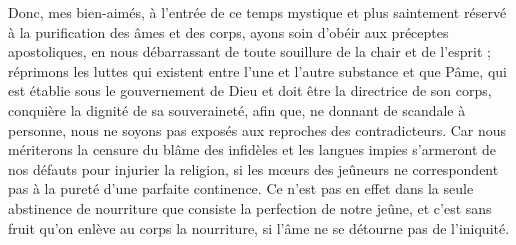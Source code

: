  Donc, mes bien-aimés, à l’entrée de ce temps mystique et plus saintement réservé à la purification des âmes et des corps, ayons soin d’obéir aux préceptes apostoliques, en nous débarrassant de toute souillure de la chair et de l’esprit ; réprimons les luttes qui existent entre l’une et l’autre substance et que Pâme, qui est établie sous le gouvernement de Dieu et doit être la directrice de son corps, conquière la dignité de sa souveraineté, afin que, ne donnant de scandale à personne, nous ne soyons pas exposés aux reproches des contradicteurs. Car nous mériterons la censure du blâme des infidèles et les langues impies s’armeront de nos défauts pour injurier la religion, si les mœurs des jeûneurs ne correspondent pas à la pureté d’une parfaite continence. Ce n’est pas en effet dans la seule abstinence de nourriture que consiste la perfection de notre jeûne, et c’est sans fruit qu’on enlève au corps la nourriture, si l’âme ne se détourne pas de l’iniquité.